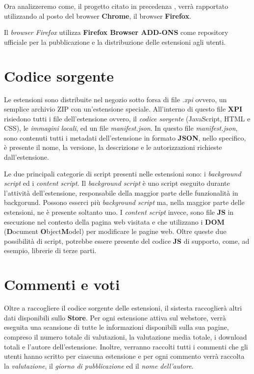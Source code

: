 \documentclass[ 11pt, oneside, italian, onehalfspacing, headsepline, ]{MastersDoctoralThesis}
\begin{document}
\par

Ora analizzeremo come, il progetto citato in precedenza \citep{ReferenceArticle}, verrà rapportato utilizzando al posto del browser \textbf{Chrome}, il browser \textbf{Firefox}. \newline

Il \textit{browser Firefox} utilizza \textbf{Firefox Browser ADD-ONS} \citep{FirefoxAddOnsStore} come repository ufficiale per la pubblicazione e la distribuzione delle estensioni agli utenti. 

{\section{Codice sorgente}}

Le estensioni sono distribuite nel negozio sotto forsa di file \textit{.xpi} ovvero, un semplice archivio ZIP con un'estensione speciale. All'interno di questo file \textbf{XPI} risiedono tutti i file dell'estensione ovvero, il \textit{codice sorgente} (JavaScript, HTML e CSS), le \textit{immagini locali}, ed un file \textit{manifest.json}. In questo file \textit{manifest.json}, sono contenuti tutti i metadati dell'estensione in formato \textbf{JSON}, nello specifico, è presente il nome, la versione, la descrizione e le autorizzazioni richieste dall'estensione. \newline

Le due principali categorie di script presenti nelle estensioni sono: i \textit{background script} ed i \textit{content script}. Il \textit{background script} è uno script eseguito durante l'attività dell'estensione, responsabile della maggior parte delle funzionalità in backgorund. Possono esserci più \textit{background script} ma, nella maggior parte delle estensioni, ne è presente soltanto uno. I \textit{content script} invece, sono file \textbf{JS} in esecuzione nel contesto della pagina web visitata e che utilizzano i \textbf{DOM} (\textbf{D}ocument \textbf{O}bject\textbf{M}odel) per modificare le pagine web. Oltre queste due possibilità di script, potrebbe essere presente del codice \textbf{JS} di supporto, come, ad esempio, librerie di terze parti.

{\section{Commenti e voti}}

Oltre a raccogliere il codice sorgente delle estensioni, il sistesta raccoglierà altri dati disponibili sullo \textbf{Store}. Per ogni estensione attiva sul webstore, verrà eseguita una scansione di tutte le informazioni disponibili sulla sua pagine, compreso il numero totale di valutazioni, la valutazione media totale, i download totali e l'autore dell'estensione. Inoltre, verranno raccolti tutti i commenti che gli utenti hanno scritto per ciascuna estensione e per ogni commento verrà raccolta la \textit{valutazione}, il  \textit{giorno di pubblicazione} ed il  \textit{nome dell'autore}.
\end{document}
